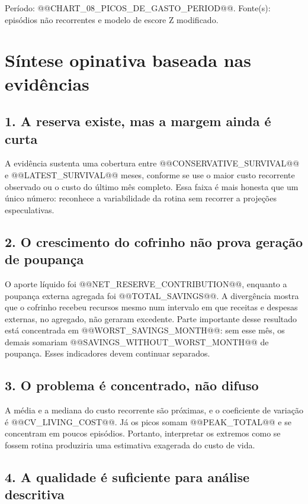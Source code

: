 \documentclass[11pt,a4paper]{article}
\newcommand{\SourceNote}[2]{%
  {\footnotesize\color{Muted} Período: #1. Fonte(s): #2.\par}
}
\begin{document}
\SourceNote{@@CHART_08_PICOS_DE_GASTO_PERIOD@@}{episódios não recorrentes e modelo de escore Z modificado}

\clearpage
\section{Síntese opinativa baseada nas evidências}

\subsection{1. A reserva existe, mas a margem ainda é curta}

A evidência sustenta uma cobertura entre @@CONSERVATIVE_SURVIVAL@@ e @@LATEST_SURVIVAL@@ meses, conforme se use o maior custo recorrente observado ou o custo do último mês completo. Essa faixa é mais honesta que um único número: reconhece a variabilidade da rotina sem recorrer a projeções especulativas.

\subsection{2. O crescimento do cofrinho não prova geração de poupança}

O aporte líquido foi @@NET_RESERVE_CONTRIBUTION@@, enquanto a poupança externa agregada foi @@TOTAL_SAVINGS@@. A divergência mostra que o cofrinho recebeu recursos mesmo num intervalo em que receitas e despesas externas, no agregado, não geraram excedente. Parte importante desse resultado está concentrada em @@WORST_SAVINGS_MONTH@@: sem esse mês, os demais somariam @@SAVINGS_WITHOUT_WORST_MONTH@@ de poupança. Esses indicadores devem continuar separados.

\subsection{3. O problema é concentrado, não difuso}

A média e a mediana do custo recorrente são próximas, e o coeficiente de variação é @@CV_LIVING_COST@@. Já os picos somam @@PEAK_TOTAL@@ e se concentram em poucos episódios. Portanto, interpretar os extremos como se fossem rotina produziria uma estimativa exagerada do custo de vida.

\subsection{4. A qualidade é suficiente para análise descritiva}
\end{document}

